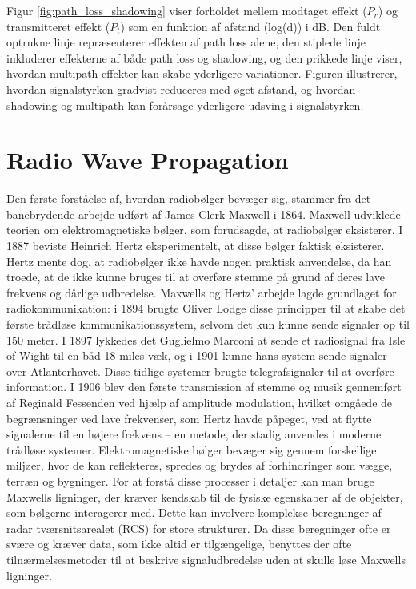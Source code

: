 \documentclass[a4paper,12pt]{book}
\begin{document}
	\noindent Figur \ref{fig:path_loss_shadowing} viser forholdet mellem modtaget effekt (\(P_r\)) og transmitteret effekt (\(P_t\)) som en funktion af afstand (log(d)) i dB. Den fuldt optrukne linje repræsenterer effekten af path loss alene, den stiplede linje inkluderer effekterne af både path loss og shadowing, og den prikkede linje viser, hvordan multipath effekter kan skabe yderligere variationer. Figuren illustrerer, hvordan signalstyrken gradvist reduceres med øget afstand, og hvordan shadowing og multipath kan forårsage yderligere udsving i signalstyrken.	
	
	\section{Radio Wave Propagation}
	Den første forståelse af, hvordan radiobølger bevæger sig, stammer fra det banebrydende arbejde udført af James Clerk Maxwell i 1864. Maxwell udviklede teorien om elektromagnetiske bølger, som forudsagde, at radiobølger eksisterer. I 1887 beviste Heinrich Hertz eksperimentelt, at disse bølger faktisk eksisterer. Hertz mente dog, at radiobølger ikke havde nogen praktisk anvendelse, da han troede, at de ikke kunne bruges til at overføre stemme på grund af deres lave frekvens og dårlige udbredelse. Maxwells og Hertz' arbejde lagde grundlaget for radiokommunikation: i 1894 brugte Oliver Lodge disse principper til at skabe det første trådløse kommunikationssystem, selvom det kun kunne sende signaler op til 150 meter. I 1897 lykkedes det Guglielmo Marconi at sende et radiosignal fra Isle of Wight til en båd 18 miles væk, og i 1901 kunne hans system sende signaler over Atlanterhavet. Disse tidlige systemer brugte telegrafsignaler til at overføre information. I 1906 blev den første transmission af stemme og musik gennemført af Reginald Fessenden ved hjælp af amplitude modulation, hvilket omgåede de begrænsninger ved lave frekvenser, som Hertz havde påpeget, ved at flytte signalerne til en højere frekvens – en metode, der stadig anvendes i moderne trådløse systemer.
	\newline\newline\noindent
	Elektromagnetiske bølger bevæger sig gennem forskellige miljøer, hvor de kan reflekteres, spredes og brydes af forhindringer som vægge, terræn og bygninger. For at forstå disse processer i detaljer kan man bruge Maxwells ligninger, der kræver kendskab til de fysiske egenskaber af de objekter, som bølgerne interagerer med. Dette kan involvere komplekse beregninger af radar tværsnitsarealet (RCS) for store strukturer. Da disse beregninger ofte er svære og kræver data, som ikke altid er tilgængelige, benyttes der ofte tilnærmelsesmetoder til at beskrive signaludbredelse uden at skulle løse Maxwells ligninger.
\end{document}
